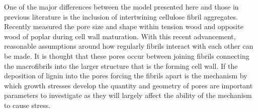 One of the major differences between the model presented here and those in previous
literature is the inclusion of intertwining cellulose fibril aggregates. Recently \citet{Chang_2014} measured the pore size and shape within tension wood and opposite
wood of poplar during cell wall maturation. With this recent advancement,
reasonable assumptions around how regularly fibrils interact with each other can be made. It is thought that these pores
occur between joining fibrils connecting the macrofibrils into the larger
structure that is the forming cell wall. If the deposition of lignin into the
pores forcing the fibrils apart is the mechanism by which growth stresses
develop the quantity and geometry of pores are important parameters to
investigate as they will largely affect the ability of the mechanism to cause
stress.